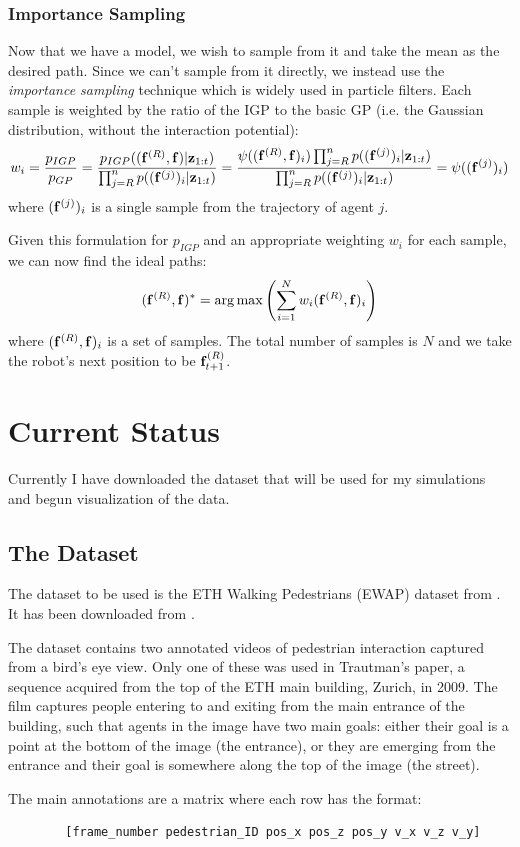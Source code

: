\documentclass[a4paper,11pt,headings=small]{article}
\DeclareMathOperator*{\argmax}{arg\,max}
\begin{document}
\subsubsection*{Importance Sampling}
\quad Now that we have a model, we wish to sample from it and take the mean as the desired path. Since we can't sample from it directly, we instead use the \emph{importance sampling} technique which is widely used in particle filters. Each sample is weighted by the ratio of the IGP to the basic GP (i.e. the Gaussian distribution, without the interaction potential):
$$ w_i = \frac{p_{IGP}}{p_{GP}} = \frac{p_{IGP}((\mathbf{f}^{(R)},\mathbf{f}) | \mathbf{z}_{1:t})}{\prod_{j=R}^n p((\mathbf{f}^{(j)})_i | \mathbf{z}_{1:t})} = \frac{\psi((\mathbf{f}^{(R)},\mathbf{f})_i) \prod_{j=R}^n p((\mathbf{f}^{(j)})_i | \mathbf{z}_{1:t})}{\prod_{j=R}^n p((\mathbf{f}^{(j)})_i | \mathbf{z}_{1:t})} = \psi((\mathbf{f}^{(j)})_i)$$
where $(\mathbf{f}^{(j)})_i$ is a single sample from the trajectory of agent $j$.

Given this formulation for $p_{IGP}$ and an appropriate weighting $w_i$ for each sample, we can now find the ideal paths:
$$ (\fr,\f)^* = \argmax\left( \sum_{i=1}^N w_i(\fr,\f)_i \right) $$
where $(\mathbf{f}^{(R)},\mathbf{f})_i$ is a set of samples. The total number of samples is $N$ and we take the robot's next position to be $\mathbf{f}^{(R)}_{t+1}$.

\section*{Current Status}
\quad Currently I have downloaded the dataset that will be used for my simulations and begun visualization of the data.

\subsection*{The Dataset}
\quad The dataset to be used is the ETH Walking Pedestrians (EWAP) dataset from \cite{Pellegrini2009}. It has been downloaded from \cite{dataset}.

The dataset contains two annotated videos of pedestrian interaction captured from a bird's eye view. Only one of these was used in Trautman's paper, a sequence acquired from the top of the ETH main building, Zurich, in 2009. The film captures people entering to and exiting from the main entrance of the building, such that agents in the image have two main goals: either their goal is a point at the bottom of the image (the entrance), or they are emerging from the entrance and their goal is somewhere along the top of the image (the street).

The main annotations are a matrix where each row has the format:
\begin{verbatim}
        [frame_number pedestrian_ID pos_x pos_z pos_y v_x v_z v_y]
\end{verbatim}
\end{document}

